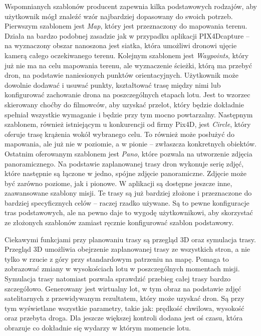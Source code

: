 Wspomnianych szablonów producent zapewnia kilka podstawowych rodzajów, aby użytkownik mógł znaleźć wzór najbardziej dopasowany do swoich potrzeb. Pierwszym szablonem jest \textit{Map}, który jest przeznaczony do mapowania terenu. Działa na bardzo podobnej zasadzie jak w przypadku aplikacji PIX4Dcapture – na wyznaczony obszar nanoszona jest siatka, która umożliwi dronowi ujęcie kamerą całego oczekiwanego terenu. Kolejnym szablonem jest \textit{Waypoints}, który już nie ma na celu mapowania terenu, ale wyznaczenie ścieżki, którą ma przebyć dron, na podstawie naniesionych punktów orientacyjnych. Użytkownik może dowolnie dodawać i usuwać punkty, kształtować trasę między nimi lub konfigurować zachowanie drona na poszczególnych etapach lotu. Jest to wzorzec skierowany choćby do filmowców, aby uzyskać przelot, który będzie dokładnie spełniał wszystkie wymaganie i będzie przy tym mocno powtarzalny. Następnym szablonem, również istniejącym u konkurencji od firmy Pix4D, jest \textit{Circle}, który oferuje trasę krążenia wokół wybranego celu. To również może posłużyć do mapowania, ale już nie w poziomie, a w pionie – zwłaszcza konkretnych obiektów. Ostatnim oferowanym szablonem jest \textit{Pano}, które pozwala na utworzenie zdjęcia panoramicznego. Na podstawie zaplanowanej trasy dron wykonuje serię zdjęć, które następnie są łączone w jedno, spójne zdjęcie panoramiczne. Zdjęcie może być zarówno poziome, jak i pionowe. W aplikacji są dostępne jeszcze inne, zaawansowane szablony misji. Te trasy są już bardziej złożone i przeznaczone do bardziej specyficznych celów – raczej rzadko używane. Są to pewne konfiguracje tras podstawowych, ale na pewno daje to wygodę użytkownikowi, aby skorzystać ze złożonych szablonów zamiast ręcznie konfigurować szablon podstawowy.

Ciekawymi funkcjami przy planowaniu trasy są przegląd 3D oraz symulacja trasy. Przegląd 3D umożliwia obejrzenie zaplanowanej trasy ze wszystkich stron, a nie tylko w rzucie z góry przy standardowym patrzeniu na mapę. Pomaga to zobrazować zmiany w wysokościach lotu w poszczególnych momentach misji. Symulacja trasy natomiast pozwala sprawdzić przebieg całej trasy bardzo szczegółowo. Generowany jest wirtualny lot, w tym obraz na podstawie zdjęć satelitarnych z przewidywanym rezultatem, który może uzyskać dron. Są przy tym wyświetlane wszystkie parametry, takie jak: prędkość chwilowa, wysokość oraz przebyta droga. Dla jeszcze większej kontroli dodana jest oś czasu, która obrazuje co dokładnie się wydarzy w którym momencie lotu.

